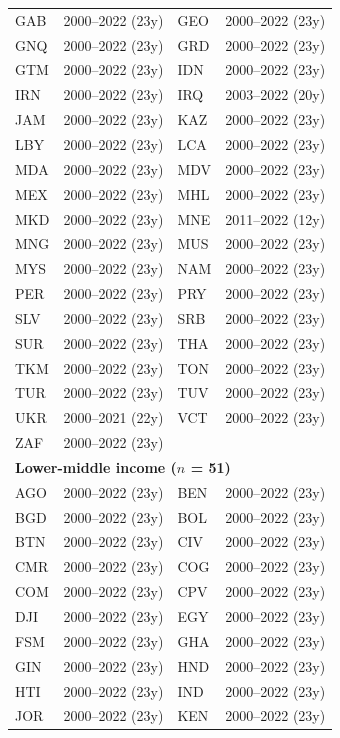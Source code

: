\documentclass[10pt,a4paper]{article}
\begin{document}
\begin{center}
\begin{longtable}{llll}
GAB & 2000--2022 (23y) & GEO & 2000--2022 (23y) \\
GNQ & 2000--2022 (23y) & GRD & 2000--2022 (23y) \\
GTM & 2000--2022 (23y) & IDN & 2000--2022 (23y) \\
IRN & 2000--2022 (23y) & IRQ & 2003--2022 (20y) \\
JAM & 2000--2022 (23y) & KAZ & 2000--2022 (23y) \\
LBY & 2000--2022 (23y) & LCA & 2000--2022 (23y) \\
MDA & 2000--2022 (23y) & MDV & 2000--2022 (23y) \\
MEX & 2000--2022 (23y) & MHL & 2000--2022 (23y) \\
MKD & 2000--2022 (23y) & MNE & 2011--2022 (12y) \\
MNG & 2000--2022 (23y) & MUS & 2000--2022 (23y) \\
MYS & 2000--2022 (23y) & NAM & 2000--2022 (23y) \\
PER & 2000--2022 (23y) & PRY & 2000--2022 (23y) \\
SLV & 2000--2022 (23y) & SRB & 2000--2022 (23y) \\
SUR & 2000--2022 (23y) & THA & 2000--2022 (23y) \\
TKM & 2000--2022 (23y) & TON & 2000--2022 (23y) \\
TUR & 2000--2022 (23y) & TUV & 2000--2022 (23y) \\
UKR & 2000--2021 (22y) & VCT & 2000--2022 (23y) \\
ZAF & 2000--2022 (23y) & & \\
\multicolumn{4}{l}{\textbf{Lower-middle income ($n$ = 51)}}\\
AGO & 2000--2022 (23y) & BEN & 2000--2022 (23y) \\
BGD & 2000--2022 (23y) & BOL & 2000--2022 (23y) \\
BTN & 2000--2022 (23y) & CIV & 2000--2022 (23y) \\
CMR & 2000--2022 (23y) & COG & 2000--2022 (23y) \\
COM & 2000--2022 (23y) & CPV & 2000--2022 (23y) \\
DJI & 2000--2022 (23y) & EGY & 2000--2022 (23y) \\
FSM & 2000--2022 (23y) & GHA & 2000--2022 (23y) \\
GIN & 2000--2022 (23y) & HND & 2000--2022 (23y) \\
HTI & 2000--2022 (23y) & IND & 2000--2022 (23y) \\
JOR & 2000--2022 (23y) & KEN & 2000--2022 (23y) \\

\end{longtable}
\end{center}
\end{document}

